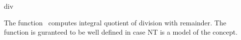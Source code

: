 \begin{ccRefFunction}{div}

\ccDefinition

The function \ccRefName\ computes integral quotient of division with remainder.
The function is guranteed to be well defined in case NT
is a model of the  concept. 


{}

\ccSeeAlso

\\
\\
\\
\\

\end{ccRefFunction}
